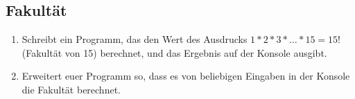 \subsection{Fakultät }
\begin{enumerate}
    \item Schreibt ein Programm, das den Wert des Ausdrucks $1 * 2 * 3 * \ldots * 15 = 15!$ (Fakultät von 15) berechnet, und das Ergebnis auf der Konsole ausgibt.
    \item Erweitert euer Programm so, dass es von beliebigen Eingaben in der Konsole die Fakultät berechnet.
\end{enumerate}
